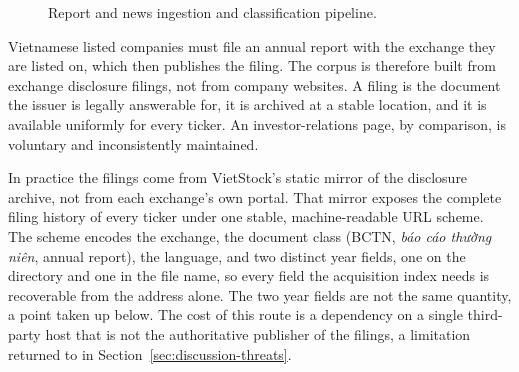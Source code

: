 \documentclass[fontsize=12pt,oneside,headings=small]{scrreprt}
\begin{document}
\begin{figure}[H]
{%
  }
  \caption[Data construction pipeline: report and news ingestion]{Report and
    news ingestion and classification pipeline.}
  \label{fig:pipeline-overview}
\end{figure}

Vietnamese listed companies must file an annual report with the exchange they are listed on, which then publishes the filing. The corpus is therefore built from exchange disclosure filings, not from company websites. A filing is the document the issuer is legally answerable for, it is archived at a stable location, and it is available uniformly for every ticker. An investor-relations page, by comparison, is voluntary and inconsistently maintained.

In practice the filings come from VietStock's static mirror of the disclosure archive, not from each exchange's own portal. That mirror exposes the complete filing history of every ticker under one stable, machine-readable URL scheme. The scheme encodes the exchange, the document class (BCTN, \textit{báo cáo thường niên}, annual report), the language, and two distinct year fields, one on the directory and one in the file name, so every field the acquisition index needs is recoverable from the address alone. The two year fields are not the same quantity, a point taken up below. The cost of this route is a dependency on a single third-party host that is not the authoritative publisher of the filings, a limitation returned to in Section~\ref{sec:discussion-threats}.
\end{document}
